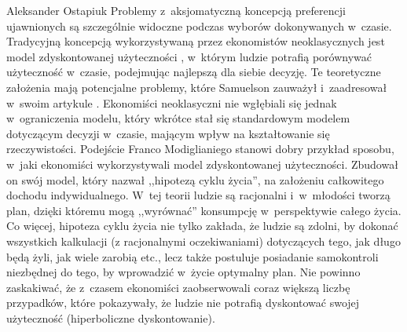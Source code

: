 \begin{artplenv}{Aleksander Ostapiuk}
Problemy z~aksjomatyczną koncepcją preferencji ujawnionych są szczególnie widoczne podczas wyborów
dokonywanych w~czasie. Tradycyjną koncepcją wykorzystywaną przez ekonomistów neoklasycznych jest model zdyskontowanej użyteczności
\parencite{samuelson_note_1937},
w~którym ludzie potrafią porównywać użyteczność w~czasie, podejmując
najlepszą dla siebie decyzję. Te teoretyczne założenia mają potencjalne problemy, które Samuelson
zauważył i~zaadresował w~swoim artykule
\parencite*{samuelson_note_1937}.
Ekonomiści neoklasyczni nie wgłębiali się jednak w~ograniczenia modelu,
który wkrótce stał się standardowym modelem dotyczącym decyzji w~czasie, mającym wpływ na
kształtowanie się rzeczywistości. Podejście Franco Modiglianiego
\parencite*{modigliani_life_1966}
stanowi dobry przykład sposobu, w~jaki
ekonomiści wykorzystywali model zdyskontowanej użyteczności. Zbudował on swój model, który nazwał
,,hipotezą cyklu życia'', na założeniu całkowitego dochodu indywidualnego. W~tej teorii ludzie są racjonalni i~w~młodości tworzą
plan, dzięki któremu mogą ,,wyrównać'' konsumpcję w~perspektywie całego życia. Co więcej, hipoteza cyklu życia nie tylko
zakłada, że ludzie są zdolni, by dokonać wszystkich kalkulacji (z racjonalnymi oczekiwaniami) dotyczących tego, jak
długo będą żyli, jak wiele zarobią etc., lecz także postuluje posiadanie samokontroli niezbędnej do tego, by
wprowadzić w~życie optymalny plan. Nie powinno zaskakiwać, że z~czasem ekonomiści zaobserwowali coraz większą liczbę
przypadków, które pokazywały, że ludzie nie potrafią dyskontować swojej użyteczność (hiperboliczne dyskontowanie).

\enlargethispage{.5\baselineskip}


\end{artplenv}
